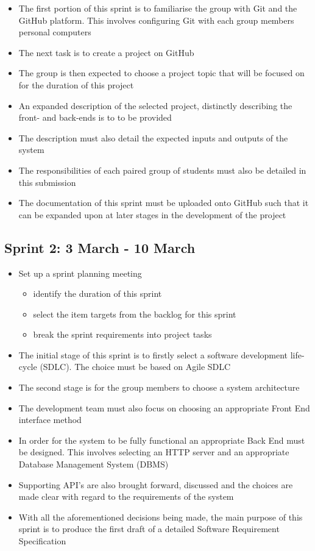 \documentclass[10pt,twocolumn]{witseiepaper}
\begin{document}
	\begin{itemize}
		\item The first portion of this sprint is to familiarise the group with Git and the GitHub platform. This involves configuring Git with each group members personal computers 
		\item The next task is to create a project on GitHub
		\item The group is then expected to choose a project topic that will be focused on for the duration of this project
		\item An expanded description of the selected project, distinctly describing the front- and back-ends is to to be provided
		\item The description must also detail the expected inputs and outputs of the system
		\item The responsibilities of each paired group of students must also be detailed in this submission
		\item The documentation of this sprint must be uploaded onto GitHub such that it can be expanded upon at later stages in the development of the project
	\end{itemize}
	
	\subsection{Sprint 2: 3 March - 10 March}
	
	\begin{itemize}
		\item Set up a sprint planning meeting
		\begin{itemize}
			\item identify the duration of this sprint
			\item select the item targets from the backlog for this sprint
			\item break the sprint requirements into project tasks
		\end{itemize}
		\item The initial stage of this sprint is to firstly select a software development life-cycle (SDLC). The choice must be based on Agile SDLC
		\item The second stage is for the group members to choose a system architecture
		\item The development team must also focus on choosing an appropriate Front End interface method
		\item In order for the system to be fully functional an appropriate Back End must be designed. This involves selecting an HTTP server and an appropriate Database Management System (DBMS)
		\item Supporting API's are also brought forward, discussed and the choices are made clear with regard to the requirements of the system
		\item With all the aforementioned decisions being made, the main purpose of this sprint is to produce the first draft of a detailed Software Requirement Specification				
	\end{itemize}
	
\end{document}
